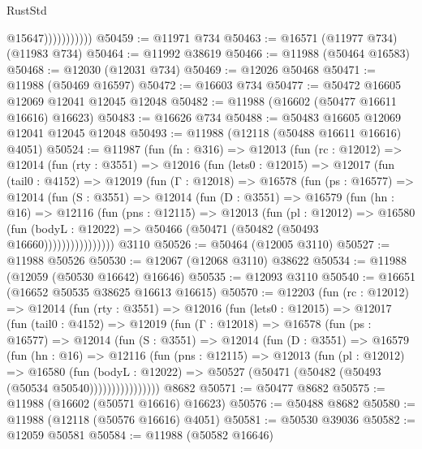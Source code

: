 \begin{lexlean}{RustStd}
\begin{coremodule}
                          @15647)))))))))))
@50459 := @11971 @734
@50463 := @16571 (@11977 @734) (@11983 @734)
@50464 := @11992 @38619
@50466 := @11988 (@50464 @16583)
@50468 := @12030 (@12031 @734)
@50469 := @12026 @50468
@50471 := @11988 (@50469 @16597)
@50472 := @16603 @734
@50477 := @50472 @16605 @12069 @12041 @12045 @12048
@50482 := @11988 (@16602 (@50477 @16611 @16616) @16623)
@50483 := @16626 @734
@50488 := @50483 @16605 @12069 @12041 @12045 @12048
@50493 := @11988 (@12118 (@50488 @16611 @16616) @4051)
@50524 := @11987
    (fun (fn : @316) =>
    @12013
      (fun (rc : @12012) =>
      @12014
        (fun (rty : @3551) =>
        @12016
          (fun (lets0 : @12015) =>
          @12017
            (fun (tail0 : @4152) =>
            @12019
              (fun (Γ : @12018) =>
              @16578
                (fun (ps : @16577) =>
                @12014
                  (fun (S : @3551) =>
                  @12014
                    (fun (D : @3551) =>
                    @16579
                      (fun (hn : @16) =>
                      @12116
                        (fun (pns : @12115) =>
                        @12013
                          (fun (pl : @12012) =>
                          @16580
                            (fun (bodyL : @12022) =>
                            @50466 (@50471 (@50482 (@50493 @16660))))))))))))))))
    @3110
@50526 := @50464 (@12005 @3110)
@50527 := @11988 @50526
@50530 := @12067 (@12068 @3110) @38622
@50534 := @11988 (@12059 (@50530 @16642) @16646)
@50535 := @12093 @3110
@50540 := @16651 (@16652 @50535 @38625 @16613 @16615)
@50570 := @12203
    (fun (rc : @12012) =>
    @12014
      (fun (rty : @3551) =>
      @12016
        (fun (lets0 : @12015) =>
        @12017
          (fun (tail0 : @4152) =>
          @12019
            (fun (Γ : @12018) =>
            @16578
              (fun (ps : @16577) =>
              @12014
                (fun (S : @3551) =>
                @12014
                  (fun (D : @3551) =>
                  @16579
                    (fun (hn : @16) =>
                    @12116
                      (fun (pns : @12115) =>
                      @12013
                        (fun (pl : @12012) =>
                        @16580
                          (fun (bodyL : @12022) =>
                          @50527 (@50471 (@50482 (@50493 (@50534 @50540))))))))))))))))
    @8682
@50571 := @50477 @8682
@50575 := @11988 (@16602 (@50571 @16616) @16623)
@50576 := @50488 @8682
@50580 := @11988 (@12118 (@50576 @16616) @4051)
@50581 := @50530 @39036
@50582 := @12059 @50581
@50584 := @11988 (@50582 @16646)

\end{coremodule}
\end{lexlean}
